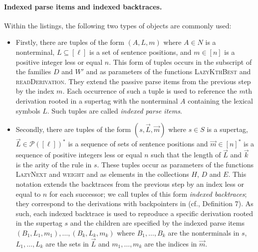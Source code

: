 \documentclass[../../document.tex]{subfiles}
\begin{document}
    \paragraph{Indexed parse items and indexed backtraces.}
    Within the listings, the following two types of objects are commonly used:
    \begin{itemize}
        \item
            Firstly, there are tuples of the form \((A, L, m)\) where \(A \in N\) is a nonterminal, \(L \subseteq [\ell]\) is a set of sentence positions, and \(m \in [n]\) is a positive integer less or equal \(n\).
            This form of tuples occurs in the subscript of the families \(D\) and \(W'\) and as parameters of the functions \textsc{LazyKthBest} and \textsc{readDerivation}.
            They extend the passive parse items from the previous step by the index \(m\).
            Each occurrence of such a tuple is used to reference the \(m\)th derivation rooted in a supertag with the nonterminal \(A\) containing the lexical symbols \(L\).
            Such tuples are called \emph{indexed parse items}.
        \item
            Secondly, there are tuples of the form \((s, \vec{L}, \vec{m})\) where \(s\in S\) is a supertag, \(\vec{L} \in \mathcal{P}([\ell])^*\) is a sequence of sets of sentence positions and \(\vec{m} \in [n]^*\) is a sequence of positive integers less or equal \(n\) such that the length of \(\vec{L}\) and \(\vec{k}\) is the arity of the  rule in \(s\).
            These tuples occur as parameters of the functions \textsc{LazyNext} and \textsc{weight} and as elements in the collections \(H\), $D$ and $E$.
            This notation extends the backtraces from the previous step by an index less or equal to \(n\) for each successor; we call tuples of this form \emph{indexed backtraces}; they correspond to the derivations with backpointers in  (cf.\@ \citealp{HuaChia05}, Definition 7).
            As such, each indexed backtrace is used to reproduce a specific derivation rooted in the supertag \(s\) and the children are specified by the indexed parse items \((B_1, L_1, m_1), \ldots, (B_k, L_k, m_k)\) where \(B_1, \ldots, B_k\) are the  nonterminals in \(s\), \(L_1, \ldots, L_k\) are the sets in \(\vec{L}\) and \(m_1, \ldots, m_k\) are the indices in \(\vec{m}\).
    \end{itemize}
\end{document}
